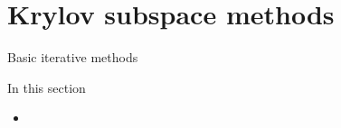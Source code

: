 \documentclass[18pt,xcolor=table]{beamer}
\begin{document}

\section{Krylov subspace methods}

\begin{frame}{Basic iterative methods}
\begin{block}{In this section}
\begin{itemize}
\item 
\end{itemize}
\end{block}

\end{frame}
\end{document}
